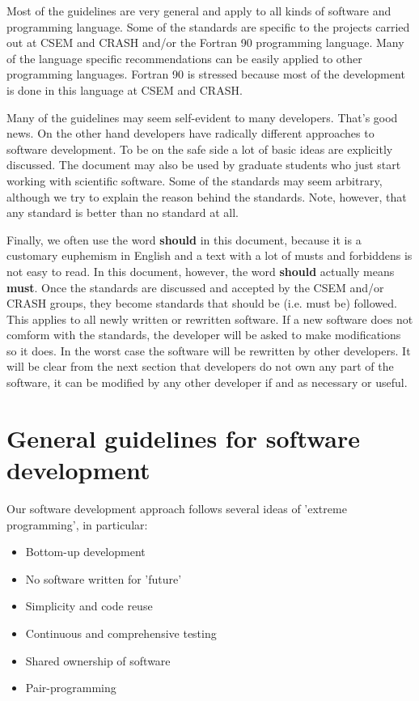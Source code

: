 \documentclass{article}
\begin{document}
Most of the guidelines are very general and apply to all kinds of 
software and programming language. Some of the standards are specific
to the projects carried out at CSEM and CRASH and/or the Fortran 90
programming language. Many of the language specific recommendations
can be easily applied to other programming languages. Fortran 90 is
stressed because most of the development is done in this language
at CSEM and CRASH. 

Many of the guidelines may seem self-evident to many developers. That's good
news. On the other hand developers have radically different approaches 
to software development. To be on the safe side 
a lot of basic ideas are explicitly discussed. The document may also be 
used by graduate students who just start working with scientific software. 
Some of the standards may seem arbitrary, although we try to explain the 
reason behind the standards. Note, however, that any standard is better than
no standard at all. 

Finally, we often use the word {\bf should} in this document, because
it is a customary euphemism in English and a text with a lot of 
musts and forbiddens is not easy to read. 
In this document, however, the word {\bf should} actually means {\bf must}. 
Once the standards are discussed and accepted by 
the CSEM and/or CRASH groups, they become standards that
should be (i.e. must be) followed. This applies to all newly written or
rewritten software. If a new software does not comform with the standards,
the developer will be asked to make modifications so it does. In the worst
case the software will be rewritten by other developers. It will be 
clear from the next section that developers do not own any part of the
software, it can be modified by any other developer if and as necessary
or useful.

\section{General guidelines for software development}

Our software development approach follows several ideas of 
'extreme programming', in particular:
\begin{itemize}
\item Bottom-up development
\item No software written for 'future'
\item Simplicity and code reuse
\item Continuous and comprehensive testing
\item Shared ownership of software
\item Pair-programming
\end{itemize}
\end{document}
